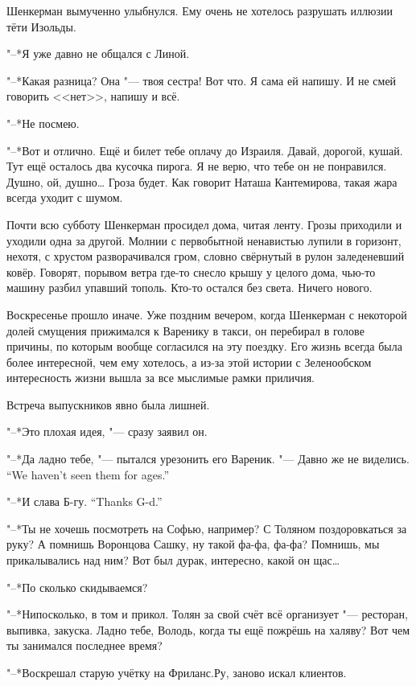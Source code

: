 Шенкерман вымученно улыбнулся.
Ему очень не хотелось разрушать иллюзии тёти Изольды.

"--*Я уже давно не общался с Линой.

"--*Какая разница?
Она "--- твоя сестра!
Вот что.
Я сама ей напишу.
И не смей говорить <<нет>>, напишу и всё.

"--*Не посмею.

"--*Вот и отлично.
Ещё и билет тебе оплачу до Израиля.
Давай, дорогой, кушай.
Тут ещё осталось два кусочка пирога.
Я не верю, что тебе он не понравился.
Душно, ой, душно\ldots{}
Гроза будет.
Как говорит Наташа Кантемирова, такая жара всегда уходит с шумом.

\asterism

Почти всю субботу Шенкерман просидел дома, читая ленту.
Грозы приходили и уходили одна за другой.
Молнии с первобытной ненавистью лупили в горизонт, нехотя, с хрустом разворачивался гром, словно свёрнутый в рулон заледеневший ковёр.
Говорят, порывом ветра где-то снесло крышу у целого дома, чью-то машину разбил упавший тополь.
Кто-то остался без света.
Ничего нового.

\label{Sun_2012_07_22}

Воскресенье прошло иначе.
Уже поздним вечером, когда Шенкерман с некоторой долей смущения прижимался к Варенику в такси, он перебирал в голове причины, по которым вообще согласился на эту поездку.
Его жизнь всегда была более интересной, чем ему хотелось, а из-за этой истории с Зеленообском интересность жизни вышла за все мыслимые рамки приличия.

Встреча выпускников явно была лишней.

"--*Это плохая идея, "--- сразу заявил он.

"--*Да ладно тебе, "--- пытался урезонить его Вареник.
{"--- Давно же не виделись.}
{``We haven't seen them for ages.''}

{"--*И слава Б-гу.}
{``Thanks G-d.''}

"--*Ты не хочешь посмотреть на Софью, например?
С Толяном поздоровкаться за руку?
А помнишь Воронцова Сашку, ну такой фа-фа, фа-фа?
Помнишь, мы прикалывались над ним?
Вот был дурак, интересно, какой он щас\ldots{}

"--*По сколько скидываемся?

"--*Нипосколько, в том и прикол.
Толян за свой счёт всё организует "--- ресторан, выпивка, закуска.
Ладно тебе, Володь, когда ты ещё пожрёшь на халяву?
Вот чем ты занимался последнее время?

"--*Воскрешал старую учётку на Фриланс.Ру, заново искал клиентов.

